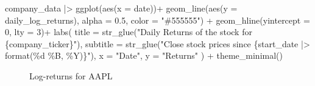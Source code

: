 \documentclass[
  12pt]{article}
\newenvironment{Shaded}{\begin{snugshade}}{\end{snugshade}}
\newcommand{\AttributeTok}[1]{\textcolor[rgb]{0.40,0.45,0.13}{#1}}
\newcommand{\DecValTok}[1]{\textcolor[rgb]{0.68,0.00,0.00}{#1}}
\newcommand{\FloatTok}[1]{\textcolor[rgb]{0.68,0.00,0.00}{#1}}
\newcommand{\FunctionTok}[1]{\textcolor[rgb]{0.28,0.35,0.67}{#1}}
\newcommand{\NormalTok}[1]{\textcolor[rgb]{0.00,0.23,0.31}{#1}}
\newcommand{\SpecialCharTok}[1]{\textcolor[rgb]{0.37,0.37,0.37}{#1}}
\newcommand{\StringTok}[1]{\textcolor[rgb]{0.13,0.47,0.30}{#1}}
\theoremstyle{definition}
\theoremstyle{remark}
\begin{document}
\begin{Shaded}
\begin{Highlighting}[]
\NormalTok{company\_data }\SpecialCharTok{|\textgreater{}} 
  \FunctionTok{ggplot}\NormalTok{(}\FunctionTok{aes}\NormalTok{(}\AttributeTok{x =}\NormalTok{ date))}\SpecialCharTok{+}
  \FunctionTok{geom\_line}\NormalTok{(}\FunctionTok{aes}\NormalTok{(}\AttributeTok{y =}\NormalTok{ daily\_log\_returns), }\AttributeTok{alpha =} \FloatTok{0.5}\NormalTok{, }\AttributeTok{color =} \StringTok{"\#555555"}\NormalTok{) }\SpecialCharTok{+}
  \FunctionTok{geom\_hline}\NormalTok{(}\AttributeTok{yintercept =} \DecValTok{0}\NormalTok{, }\AttributeTok{lty =} \DecValTok{3}\NormalTok{)}\SpecialCharTok{+}
  \FunctionTok{labs}\NormalTok{(}
    \AttributeTok{title =} \FunctionTok{str\_glue}\NormalTok{(}\StringTok{"Daily Returns of the stock for \{company\_ticker\}"}\NormalTok{), }
    \AttributeTok{subtitle =} \FunctionTok{str\_glue}\NormalTok{(}\StringTok{"Close stock prices since \{start\_date |\textgreater{} format(\textquotesingle{}\%d \%B, \%Y\textquotesingle{})\}"}\NormalTok{),}
    \AttributeTok{x =} \StringTok{"Date"}\NormalTok{,}
    \AttributeTok{y =} \StringTok{"Returns"}
\NormalTok{    ) }\SpecialCharTok{+} 
  \FunctionTok{theme\_minimal}\NormalTok{()}
\end{Highlighting}
\end{Shaded}

\begin{figure}[H]


\caption{\label{fig-log-returns-aapl}Log-returns for AAPL}

\end{figure}%
\end{document}
